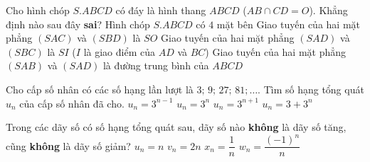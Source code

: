 \begin{ex}%
	Cho hình chóp $S.ABCD$ có đáy là hình thang $ABCD$ ($AB \cap CD = O$). Khẳng định nào sau đây \textbf{sai}?
	\choice
	{Hình chóp $S.ABCD$ có $4$ mặt bên}
	{Giao tuyến của hai mặt phẳng $(SAC)$ và $(SBD)$ là $SO$}
	{Giao tuyến của hai mặt phẳng $(SAD)$ và $(SBC)$ là $SI$ ($I$ là giao điểm của $AD$ và $BC$)}
	{\True Giao tuyến của hai mặt phẳng $(SAB)$ và $(SAD)$ là đường trung bình của $ABCD$}
\end{ex}

\begin{ex}%
	Cho cấp số nhân có các số hạng lần lượt là $ 3;\, 9;\, 27;\, 81;\ldots$. Tìm số hạng tổng quát $u_n$ của cấp số nhân đã cho.
	\choice
	{$u_n=3^{n-1}$}
	{\True $u_n=3^n$}
	{$u_n=3^{n+1}$}
	{$u_n=3+3^n$}
\end{ex}

\begin{ex}%
	Trong các dãy số có số hạng tổng quát sau, dãy số nào {\bf không} là dãy số tăng, cũng {\bf không} là dãy số giảm?
	\choice
	{$u_n=n$}
	{$v_n=2n$}
	{$x_n=\dfrac{1}{n}$}
	{\True $w_n=\dfrac{\left(-1\right)^n}{n}$}
\end{ex}

